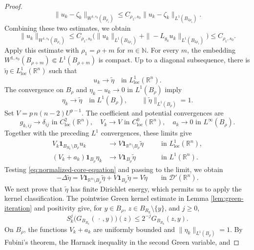 \documentclass[11pt]{article}
\numberwithin{equation}{section}
\theoremstyle{remark}
\newcommand{\R}{\mathbb R}
\begin{document}
\begin{proof}
{
\[
 \|u_k-\zeta_k\|_{W^{1,s_0}(B_{\rho_1})}
 \le C_{\rho_1,s_0}
 \|u_k-\zeta_k\|_{L^1(B_{2\rho_1})}.
\]
}
Combining these two estimates, we obtain
{
\[
 \|u_k\|_{W^{1,s_0}(B_{\rho_1})}
 \le C_{\rho_1,s_0}\bigl(
 \|u_k\|_{L^1(B_{2\rho_1})}
 +\|\!-\!L_{g_k}u_k\|_{L^1(B_{2\rho_1})}\bigr)
 \le C_{\rho_1,s_0}.
\]
}
 Apply this estimate with $\rho_1=\rho+m$ for $m \in \mathbb{N}$.
For every $m$, the embedding
$W^{1,s_0}(B_{\rho+m})\Subset L^1(B_{\rho+m})$ is compact.  Up to a
diagonal subsequence, there is
$\widetilde\eta\in L^1_{\mathrm{loc}}(\R^n)$ such that
{
\[
 u_k\to\widetilde\eta
 \quad\text{in }L^1_{\mathrm{loc}}(\R^n).
\]
}
 The convergence on $B_\rho$ and $\eta_k-u_k\to0$ in $L^1(B_\rho)$ imply
{
\[
 \eta_k\to\widetilde\eta
 \quad\text{in }L^1(B_\rho),
 \qquad
 \|\widetilde\eta\|_{L^1(B_\rho)}=1.
\]
}
Set $V=p\,n(n-2)U^{p-1}$.  The coefficient and potential convergences are
{
\begin{equation}\label{eq:coefficient-potential-convergence}
 g_{k,ij}\to\delta_{ij}\text{ in }C^2_{\mathrm{loc}}(\R^n),
 \quad V_k\to V\text{ in }C^0_{\mathrm{loc}}(\R^n),
 \quad a_k\to0\text{ in }L^\infty(B_\rho).
\end{equation}
}
Together with the preceding $L^1$ convergences, these limits give
{
\[
\begin{aligned}
 V_k\mathbf1_{B_{R_k}\setminus B_\rho}u_k
 &\to V\mathbf1_{\R^n\setminus B_\rho}\widetilde\eta
 &&\quad\text{in }L^1_{\mathrm{loc}}(\R^n),\\
 (V_k+a_k)\mathbf1_{B_\rho}\eta_k
 &\to V\mathbf1_{B_\rho}\widetilde\eta
 &&\quad\text{in }L^1(\R^n).
\end{aligned}
\]
}
Testing \eqref{eq:normalized-core-equation} and passing to the limit, we
obtain
{
\begin{equation}\label{eq:whole-space-limit-equation}
 -\Delta\widetilde\eta
 =V\mathbf1_{\R^n\setminus B_\rho}\widetilde\eta
   +V\mathbf1_{B_\rho}\widetilde\eta
  =V\widetilde\eta
 \qquad\text{in }\mathcal D'(\R^n).
\end{equation}
}
We next prove that $\widetilde\eta$ has finite Dirichlet energy, which permits
us to apply the kernel classification.
The pointwise Green kernel estimate in
Lemma  \ref{lem:green-iteration} and positivity give, for
\(y\in B_\rho\), \(z\in B_{R_k}\setminus\{y\}\), and \(j\ge0\),
\[
 S_k^j\bigl(G_{B_{R_k}}(\,\cdot\,,y)\bigr)(z)
 \le2^{-j}G_{B_{R_k}}(z,y).
\]
On $B_\rho$, the functions $V_k+a_k$ are uniformly bounded and
$\|\eta_k\|_{L^1(B_\rho)}=1$.  By Fubini's theorem, the Harnack inequality
in the second Green variable, and

\end{proof}
\end{document}

